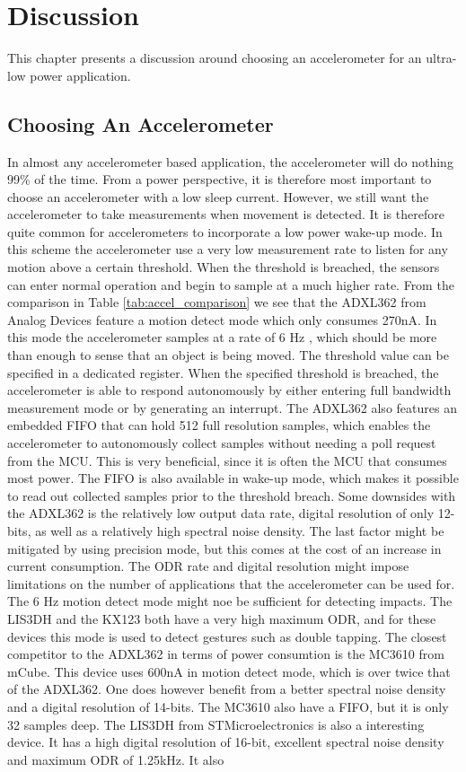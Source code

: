 \chapter{Discussion}

This chapter presents a discussion around choosing an accelerometer for an ultra-low power application.

\section{Choosing An Accelerometer}

In almost any accelerometer based application, the accelerometer will do nothing 99\% of the time. From a power perspective, it is therefore most important to choose an accelerometer with a low sleep current. However, we still want the accelerometer to take measurements when movement is detected. It is therefore quite common for accelerometers to incorporate a low power wake-up mode. In this scheme the accelerometer use a very low measurement rate to listen for any motion above a certain threshold. When the threshold is breached, the sensors can enter normal operation and begin to sample at a much higher rate. From the comparison in Table \ref{tab:accel_comparison} we see that the ADXL362 from Analog Devices feature a motion detect mode which only consumes 270nA. In this mode the accelerometer samples at a rate of 6 Hz \cite{adxl362}, which should be more than enough to sense that an object is being moved. The threshold value can be specified in a dedicated register. When the specified threshold is breached, the accelerometer is able to respond autonomously by either entering full bandwidth measurement mode or by generating an interrupt. The ADXL362 also features an embedded FIFO that can hold 512 full resolution samples, which enables the accelerometer to autonomously collect samples without needing a poll request from the MCU. This is very beneficial, since it is often the MCU that consumes most power. The FIFO is also available in wake-up mode, which makes it possible to read out collected samples prior to the threshold breach. Some downsides with the ADXL362 is the relatively low output data rate, digital resolution of only 12-bits, as well as a relatively high spectral noise density. The last factor might be mitigated by using precision mode, but this comes at the cost of an increase in current consumption. The ODR rate and digital resolution might impose limitations on the number of applications that the accelerometer can be used for. The 6 Hz motion detect mode might noe be sufficient for detecting impacts. The LIS3DH and the KX123 both have a very high maximum ODR, and for these devices this mode is used to detect gestures such as double tapping. The closest competitor to the ADXL362 in terms of power consumtion is the MC3610 from mCube. This device uses 600nA in motion detect mode, which is over twice that of the ADXL362. One does however benefit from a better spectral noise density and a digital resolution of 14-bits. The MC3610 also have a FIFO, but it is only 32 samples deep. The LIS3DH from STMicroelectronics is also a interesting device. It has a high digital resolution of 16-bit, excellent spectral noise density and maximum ODR of 1.25kHz. It also 